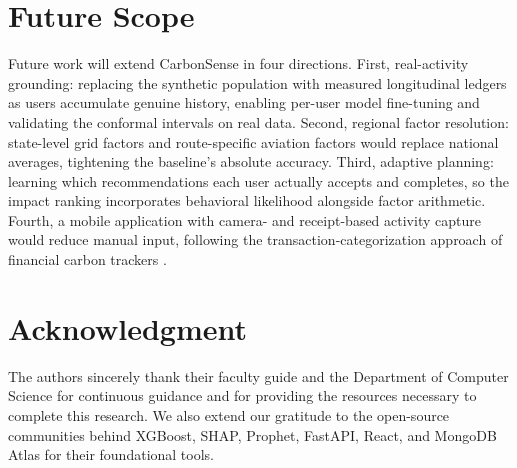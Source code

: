 \documentclass[conference]{IEEEtran}
\begin{document}
\section{Future Scope}

Future work will extend CarbonSense in four directions. First, real-activity grounding: replacing the synthetic population with measured longitudinal ledgers as users accumulate genuine history, enabling per-user model fine-tuning and validating the conformal intervals on real data. Second, regional factor resolution: state-level grid factors and route-specific aviation factors would replace national averages, tightening the baseline's absolute accuracy. Third, adaptive planning: learning which recommendations each user actually accepts and completes, so the impact ranking incorporates behavioral likelihood alongside factor arithmetic. Fourth, a mobile application with camera- and receipt-based activity capture would reduce manual input, following the transaction-categorization approach of financial carbon trackers \cite{joro2024}.

\section*{Acknowledgment}

The authors sincerely thank their faculty guide and the Department of Computer Science for continuous guidance and for providing the resources necessary to complete this research. We also extend our gratitude to the open-source communities behind XGBoost, SHAP, Prophet, FastAPI, React, and MongoDB Atlas for their foundational tools.
\end{document}
